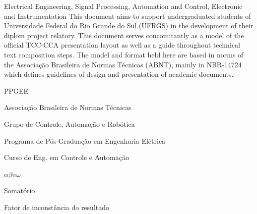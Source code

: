 \documentclass[repeatfields,xlists,xpacks,oneside,yearsonly]{ufrgscca}
\begin{document}
\begin{otherabstract}{Electrical Engineering, Signal Processing, Automation and Control, Electronic and Instrumentation}
This document aims to support undergraduated students  of Universidade Federal do Rio
Grande do Sul (UFRGS) in the development of their diplom project relatory.
This document serves concomitantly as a model of the official TCC-CCA
presentation layout as well as a guide throughout technical text composition
steps. The model and format held here are based in norms of the Associação
Brasileira de Normas Técnicas (ABNT), mainly in
NBR-14724~\cite{ABNT:NBR-14724-2011} which defines guidelines of design and
presentation of academic documents.
\end{otherabstract}


\setcounter{tocdepth}{3}

\listoffigures

\listoftables

\listofcodelist %

\begin{listofabbrv}{PPGEE}
	\item[ABNT] Associação Brasileira de Normas Técnicas
	\item[GCAR] Grupo de Controle, Automação e Robótica
	\item[PPGEE] Programa de Pós-Graduação em Engenharia Elétrica
	\item[CCA] Curso de Eng. em Controle e Automação
\end{listofabbrv}

\begin{listofsymbols}{$\alpha\beta\pi\omega$}
       \item[$\sum$] Somatório
       \item[$\alpha\beta\pi\omega$] Fator de inconstância do resultado
\end{listofsymbols}
\end{document}

